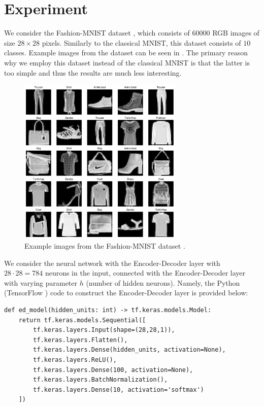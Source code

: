 \documentclass[12pt,a4paper,oneside]{book}
\theoremstyle{dplplain}
\theoremstyle{dpldefinition}
\theoremstyle{dplremark}
\begin{document}
\chapter{Experiment}

We consider the Fashion-MNIST dataset \cite{fashion-mnist}, which consists of
$60000$ RGB images of size $28 \times 28$ pixels. Similarly to the classical
MNIST, this dataset consists of $10$ classes. Example images from the dataset
can be seen in . The primary reason why we employ this 
dataset instead of the classical MNIST is that the latter is too simple and 
thus the results are much less interesting.

\begin{figure}
    \centering
    \includegraphics[width=0.7\textwidth]{../code/images/fashion_mnist_grid.pdf}
    \caption{Example images from the Fashion-MNIST dataset \cite{fashion-mnist}.}
    \label{figure:mnist}
\end{figure}

We consider the neural network with the Encoder-Decoder layer with $28 \cdot 28
= 784$ neurons in the input, connected with the Encoder-Decoder layer with
varying parameter $h$ (number of hidden neurons). Namely, the Python (TensorFlow
\cite{tf}) code to construct the Encoder-Decoder layer is provided below:

\begin{verbatim}
def ed_model(hidden_units: int) -> tf.keras.models.Model:
    return tf.keras.models.Sequential([
        tf.keras.layers.Input(shape=(28,28,1)),
        tf.keras.layers.Flatten(),
        tf.keras.layers.Dense(hidden_units, activation=None),
        tf.keras.layers.ReLU(),
        tf.keras.layers.Dense(100, activation=None),
        tf.keras.layers.BatchNormalization(),
        tf.keras.layers.Dense(10, activation='softmax')
    ])
\end{verbatim}
\end{document}
